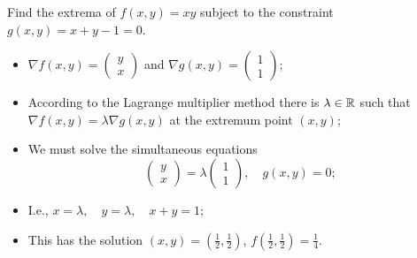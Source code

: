 \begin{example}
    Find the extrema of \(f(x,y) = xy\) subject to the constraint \(g(x,y) = x+y-1 =0\).
    \begin{itemize}
        \item \(\nabla f(x,y) = \left(\begin{smallmatrix}
                  y\\ x
              \end{smallmatrix}\right)\)
              and \(\nabla g(x,y) = \left(\begin{smallmatrix}
                  1\\ 1
              \end{smallmatrix}\right)\);
        \item  According to the Lagrange multiplier method there is \(\lambda\in \mathbb{R}\) such that \(\nabla f(x,y) = \lambda \nabla g(x,y)\) at the extremum point \((x,y)\);
        \item We must solve the simultaneous equations
              \[
                  \left(\begin{smallmatrix}
                          y\\ x
                      \end{smallmatrix}\right)
                  = \lambda \left(\begin{smallmatrix}
                          1\\ 1
                      \end{smallmatrix}\right),
                  \quad g(x,y) =0;
              \]
        \item I.e.,
              \( x = \lambda, \quad
              y = \lambda, \quad
              x+y = 1;
              \)
        \item This has the solution \((x,y) = (\frac{1}{2},\frac{1}{2})\), \(f(\frac{1}{2},\frac{1}{2})= \frac{1}{4}\).
    \end{itemize}
\end{example}


